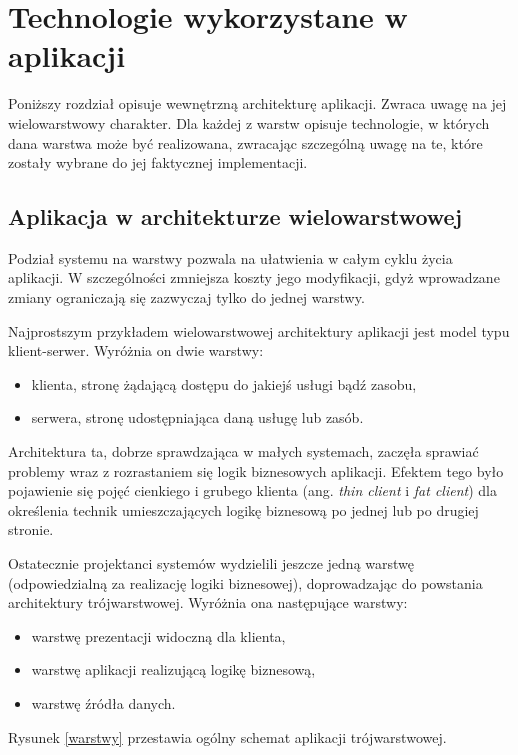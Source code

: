 \chapter{Technologie wykorzystane w aplikacji}
\label{chap4}
Poniższy rozdział opisuje wewnętrzną architekturę aplikacji. Zwraca uwagę na jej wielowarstwowy charakter. Dla każdej z warstw opisuje technologie, w których dana warstwa może być realizowana, zwracając szczególną uwagę na te, które zostały wybrane do jej faktycznej implementacji.

\section[Aplikacja w architekturze wielowarstwowej][Aplikacja w architekturze wielowarstwowej]{Aplikacja w architekturze wielowarstwowej}
Podział systemu na warstwy pozwala na ułatwienia w całym cyklu życia aplikacji. W szczególności zmniejsza koszty jego modyfikacji, gdyż wprowadzane zmiany ograniczają się zazwyczaj tylko do jednej warstwy. 

Najprostszym przykładem wielowarstwowej architektury aplikacji jest model typu klient-serwer. Wyróżnia on dwie warstwy:
\begin{itemize}
	\item klienta, stronę żądającą dostępu do jakiejś usługi bądź zasobu,
	\item serwera, stronę udostępniająca daną usługę lub zasób.
\end{itemize}
Architektura ta, dobrze sprawdzająca w małych systemach, zaczęła sprawiać problemy wraz z rozrastaniem się logik biznesowych aplikacji. Efektem tego było pojawienie się pojęć cienkiego i grubego klienta (ang. \textit{thin client} i \textit{fat client}) dla określenia technik umieszczających logikę biznesową po jednej lub po drugiej stronie.

Ostatecznie projektanci systemów wydzielili jeszcze jedną warstwę (odpowiedzialną za realizację logiki biznesowej), doprowadzając do powstania architektury trójwarstwowej. Wyróżnia ona następujące warstwy:
\begin{itemize}
	\item warstwę prezentacji widoczną dla klienta,
	\item warstwę aplikacji realizującą logikę biznesową,
	\item warstwę źródła danych.
\end{itemize}
Rysunek \ref{warstwy} przestawia ogólny schemat aplikacji trójwarstwowej.

